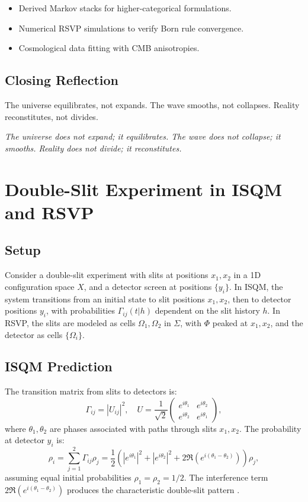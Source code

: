 \documentclass[12pt]{article}
\begin{document}
{\begin{itemize}[noitemsep]
\item Derived Markov stacks for higher-categorical formulations.
\item Numerical RSVP simulations to verify Born rule convergence.
\item Cosmological data fitting with CMB anisotropies.
\end{itemize}

\subsection{Closing Reflection}

The universe equilibrates, not expands. The wave smooths, not collapses. Reality reconstitutes, not divides.

\begin{center}
\emph{The universe does not expand; it equilibrates. The wave does not collapse; it smooths. Reality does not divide; it reconstitutes.}
\end{center}

\section{Double-Slit Experiment in ISQM and RSVP}

\subsection{Setup}

Consider a double-slit experiment with slits at positions \(x_1, x_2\) in a 1D configuration space \(X\), and a detector screen at positions \(\{y_i\}\). In ISQM, the system transitions from an initial state to slit positions \(x_1, x_2\), then to detector positions \(y_i\), with probabilities \(\Gamma_{ij}(t | h)\) dependent on the slit history \(h\). In RSVP, the slits are modeled as cells \(\Omega_1, \Omega_2\) in \(\Sigma\), with \(\Phi\) peaked at \(x_1, x_2\), and the detector as cells \(\{\Omega_i\}\).

\subsection{ISQM Prediction}

The transition matrix from slits to detectors is:
\[
\Gamma_{ij} = |U_{ij}|^2, \quad U = \frac{1}{\sqrt{2}} \begin{pmatrix} e^{i \theta_1} & e^{i \theta_2} \\ e^{i \theta_2} & e^{i \theta_1} \end{pmatrix},
\]
where \(\theta_1, \theta_2\) are phases associated with paths through slits \(x_1, x_2\). The probability at detector \(y_i\) is:
\[
\rho_i = \sum_{j=1}^2 \Gamma_{ij} \rho_j = \frac{1}{2} \left( |e^{i \theta_1}|^2 + |e^{i \theta_2}|^2 + 2 \Re (e^{i (\theta_1 - \theta_2)}) \right) \rho_j,
\]
assuming equal initial probabilities \(\rho_1 = \rho_2 = 1/2\). The interference term \(2 \Re (e^{i (\theta_1 - \theta_2)})\) produces the characteristic double-slit pattern \cite{Barandes2023}.

}
\end{document}
